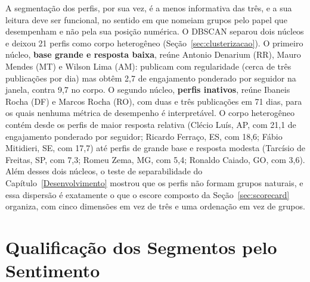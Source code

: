 A segmentação dos perfis, por sua vez, é a menos informativa das três, e a sua leitura deve ser funcional, no sentido em que  nomeiam grupos pelo papel que desempenham e não pela sua posição numérica. O DBSCAN separou dois núcleos e deixou 21 perfis como corpo heterogêneo (Seção~\ref{sec:clusterizacao}). O primeiro núcleo, \textbf{base grande e resposta baixa}, reúne Antonio Denarium (RR), Mauro Mendes (MT) e Wilson Lima (AM): publicam com regularidade (cerca de três publicações por dia) mas obtêm 2,7 de engajamento ponderado por seguidor na janela, contra 9,7 no corpo. O segundo núcleo, \textbf{perfis inativos}, reúne Ibaneis Rocha (DF) e Marcos Rocha (RO), com duas e três publicações em 71 dias, para os quais nenhuma métrica de desempenho é interpretável. O corpo heterogêneo contém desde os perfis de maior resposta relativa (Clécio Luís, AP, com 21,1 de engajamento ponderado por seguidor; Ricardo Ferraço, ES, com 18,6; Fábio Mitidieri, SE, com 17,7) até perfis de grande base e resposta modesta (Tarcísio de Freitas, SP, com 7,3; Romeu Zema, MG, com 5,4; Ronaldo Caiado, GO, com 3,6). Além desses dois núcleos, o teste de separabilidade do Capítulo~\ref{Desenvolvimento} mostrou que os perfis não formam grupos naturais, e essa dispersão é exatamente o que o escore composto da Seção~\ref{sec:scorecard} organiza, com cinco dimensões em vez de três e uma ordenação em vez de grupos.


\section{Qualificação dos Segmentos pelo Sentimento}\label{sec:qualificacao}

